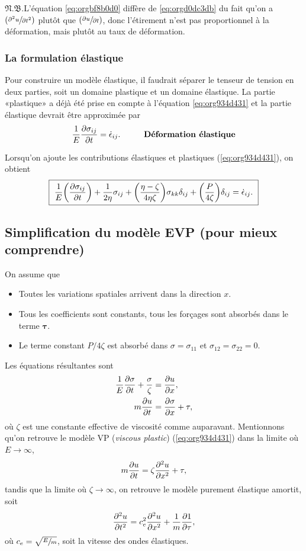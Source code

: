 \documentclass[10pt]{article}
\numberwithin{equation}{section}
\newcommand{\pt}{\hspace{1pt}} %
\newcommand{\nb}{\underline{{\footnotesize\EightStarConvex}\pt $\mathfrak{N.B.}$\vphantom{p}}\hspace{3pt}}
\begin{document}
\nb L'équation \ref{eq:orgbf8b0d0} diffère de \ref{eq:orgd0dc3db} du fait qu'on a \(\qty(\sfrac{\partial^2 u}{\partial t^2})\) plutôt que \(\qty(\sfrac{\partial u}{\partial t})\), donc l'étirement n'est pas proportionnel à la déformation, mais plutôt au taux de déformation.
\subsubsection{La formulation élastique}
\label{sec:org2e10b5a}
Pour construire un modèle élastique, il faudrait séparer le tenseur de tension en deux parties, soit un domaine plastique et un domaine élastique.
La partie «plastique» a déjà été prise en compte à l'équation \ref{eq:org934d431} et la partie élastique devrait être approximée par
\begin{equation}
   \frac{1}{E} \pdv{\sigma_{ij}}{t} = \dot{\epsilon}_{ij}. \hspace{1cm} \text{\textbf{Déformation élastique}}
\end{equation}

Lorsqu'on ajoute les contributions élastiques et plastiques (\ref{eq:org934d431}), on obtient
\begin{equation}
\label{eq:orge77f727}
   \boxed{\ \frac{1}{E} \qty(\pdv{\sigma_{ij}}{t}) + \frac{1}{2\eta}\sigma_{ij} + \qty(\frac{\eta - \zeta}{4\eta\zeta}) \sigma_{kk} \delta_{ij} + \qty(\frac{P}{4\zeta}) \delta_{ij} = \dot{\epsilon}_{ij}.\ }
\end{equation}
\subsection{Simplification du modèle EVP (pour mieux comprendre)}
\label{sec:orga10b7c4}
On assume que
\begin{itemize}
\item Toutes les variations spatiales arrivent dans la direction \(x\).
\item Tous les coefficients sont constants, tous les forçages sont absorbés dans le terme \(\boldsymbol{\tau}\).
\item Le terme constant \(P/4\zeta\) est absorbé dans \(\sigma = \sigma_{11}\) et \(\sigma_{12}=\sigma_{22} = 0\).
\end{itemize}

Les équations résultantes sont
\begin{align}
   \frac{1}{E}\pdv{\sigma}{t} + \frac{\sigma}{\zeta} &= \pdv{u}{x}, \\
   m\pdv{u}{t} &= \pdv{\sigma}{x} + \tau,
\end{align}
où \(\zeta\) est une constante effective de viscosité comme auparavant.
Mentionnons qu'on retrouve le modèle VP (\emph{viscous plastic}) (\ref{eq:org934d431}) dans la limite où \(E\rightarrow\infty\),
\begin{equation}
   m\pdv{u}{t} = \zeta\pdv[2]{u}{x} + \tau,
\end{equation}
tandis que la limite où \(\zeta\rightarrow\infty\), on retrouve le modèle purement élastique amortit, soit
\begin{equation}
   \pdv[2]{u}{t} = c_e^2\pdv[2]{u}{x} + \frac{1}{m}\pdv{1}{\tau},
\end{equation}
où \(c_e = \sqrt{\sfrac{E}{m}}\), soit la vitesse des ondes élastiques. 
\end{document}
